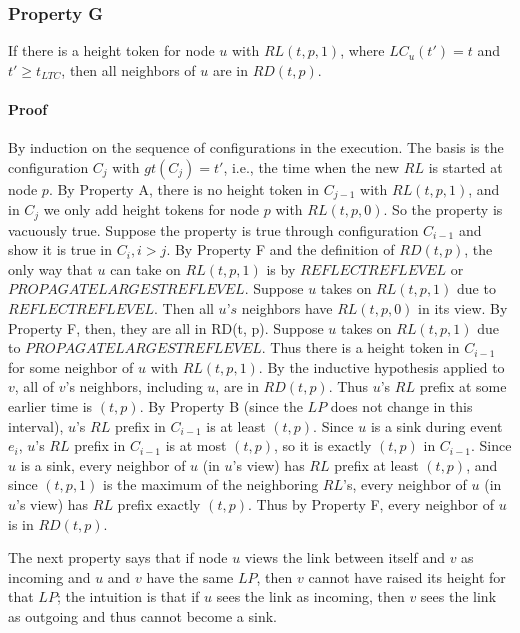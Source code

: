 \documentclass{article}
\begin{document}
\subsubsection{Property G}
If there is a height token for node $u$ with $RL(t, p, 1)$, where $LC_u(t') = t$ and $t' \geq t_{LTC}$, then all neighbors of $u$ are in $RD(t, p)$.\\

\paragraph{Proof}
By induction on the sequence of configurations in the execution. The basis is the configuration $C_j$ with $gt(C_j) = t'$, i.e., the time when the new $RL$ is started at node $p$. By Property A, there is no height token in $C_{j − 1}$ with $RL(t, p, 1)$, and in $C_j$ we only add height tokens for node $p$ with $RL(t, p, 0)$. So the property is vacuously true. Suppose the property is true through configuration $C_{i − 1}$ and show it is true in $C_i , i > j$. By Property F and the definition of $RD(t, p)$, the only way that $u$ can take on $RL(t, p, 1)$ is by $REFLECTREFLEVEL$ or $PROPAGATELARGESTREFLEVEL$. Suppose $u$ takes on $RL(t, p, 1)$ due to $REFLECTREFLEVEL$. Then all $u’s$ neighbors have $RL(t, p, 0)$ in its view. By Property F, then, they are all in RD(t, p).
Suppose $u$ takes on $RL(t, p, 1)$ due to $PROPAGATELARGESTREFLEVEL$. Thus there is a height token in $C_{i − 1}$
for some neighbor of $u$ with $RL(t, p, 1)$. By the inductive hypothesis applied to $v$, all of $v$'s neighbors, including $u$, are in $RD(t, p)$. Thus $u$'s $RL$ prefix at some earlier time is $(t, p)$. By Property B (since the $LP$ does not change in this interval), $u$'s $RL$ prefix in $C_{i − 1}$ is at least $(t, p)$. Since $u$ is a sink during event $e_i$, $u$'s $RL$ prefix in $C_{i − 1}$ is at most $(t, p)$, so it is exactly $(t, p)$ in $C_{i − 1}$. Since $u$ is a sink, every neighbor of $u$ (in $u$'s view) has $RL$ prefix at least $(t, p)$, and since $(t, p, 1)$ is the maximum of the neighboring $RL$'s, every neighbor of $u$ (in $u$'s view) has $RL$ prefix exactly $(t, p)$. Thus by Property F, every neighbor of $u$ is in $RD(t, p)$.

The next property says that if node $u$ views the link between itself and $v$ as incoming and $u$ and $v$ have the same $LP$, then $v$ cannot have raised its height for that $LP$; the intuition is that if $u$ sees the link as incoming, then $v$ sees the link as outgoing and thus cannot become a sink.
\end{document}
